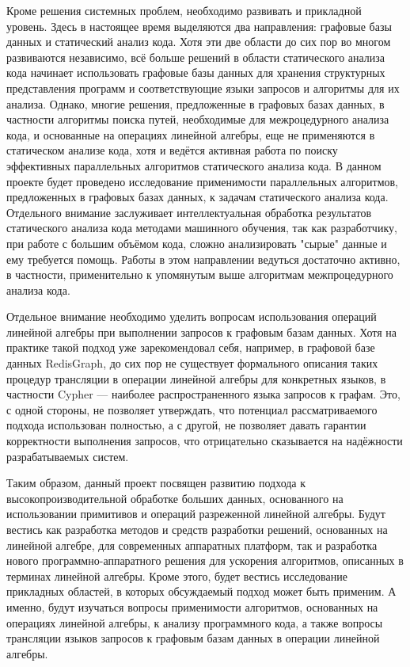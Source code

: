 \documentclass[12pt]{article}  %
\theoremstyle{remark}
\begin{document}
Кроме решения системных проблем, необходимо развивать и прикладной уровень. Здесь в настоящее время выделяются два направления: графовые базы данных и статический анализ кода. Хотя эти две области до сих пор во многом развиваются независимо, всё больше решений в области статического анализа кода начинает использовать графовые базы данных для хранения структурных представления программ и соответствующие языки запросов и алгоритмы для их анализа. Однако, многие решения, предложенные в графовых базах данных, в частности алгоритмы поиска путей, необходимые для межроцедурного анализа кода, и основанные на операциях линейной алгебры, еще не применяются в статическом анализе кода, хотя и ведётся активная работа по поиску эффективных параллельных алгоритмов статического анализа кода. В данном проекте будет проведено исследование применимости параллельных алгоритмов, предложенных в графовых базах данных, к задачам статического анализа кода. Отдельного внимание заслуживает интеллектуальная обработка результатов статического анализа кода методами машинного обучения, так как разработчику, при работе с большим объёмом кода, сложно анализировать "сырые" данные и ему требуется помощь. Работы в этом направлении ведуться достаточно активно, в частности, применительно к упомянутым выше алгоритмам межпроцедурного анализа кода. 

Отдельное внимание необходимо уделить вопросам использования операций линейной алгебры при выполнении запросов к графовым базам данных. Хотя на практике такой подход уже зарекомендовал себя, например, в графовой базе данных RedisGraph, до сих пор не существует формального описания таких процедур трансляции в операции линейной алгебры для конкретных языков, в частности Cypher --- наиболее распространенного языка запросов к графам. Это, с одной стороны, не позволяет утверждать, что потенциал рассматриваемого подхода использован полностью, а с другой, не позволяет давать гарантии корректности выполнения запросов, что отрицательно сказывается на надёжности разрабатываемых систем.

Таким образом, данный проект посвящен развитию подхода к высокопроизводительной обработке больших данных, основанного на использовании примитивов и операций разреженной линейной алгебры. Будут вестись как разработка методов и средств разработки решений, основанных на линейной алгебре, для современных аппаратных платформ, так и разработка нового программно-аппаратного решения для ускорения алгоритмов, описанных в терминах линейной алгебры. Кроме этого, будет вестись исследование прикладных областей, в которых обсуждаемый подход может быть применим. А именно, будут изучаться вопросы применимости алгоритмов, основанных на операциях линейной алгебры, к анализу программного кода, а также вопросы трансляции языков запросов к графовым базам данных в операции линейной алгебры.
\end{document}

